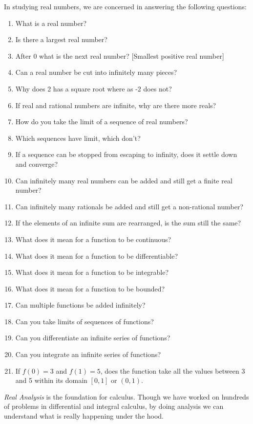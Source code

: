 \documentclass[10pt]{article}
\begin{document}
In studying real numbers, we are concerned in answering the following questions:
\begin{enumerate}
\item What is a real number?
\item Is there a largest real number?
\item After 0 what is the next real number? [Smallest positive real number]
\item Can a real number be cut into infinitely many pieces?
\item Why does 2 has a square root where as -2 does not?
\item If real and rational numbers are infinite, why are there more reals?
\item How do you take the limit of a sequence of real numbers?
\item Which sequences have limit, which don't?
\item If a sequence can be stopped from escaping to infinity, does it settle
  down and converge?
\item Can infinitely many real numbers can be added and still get a finite real
  number?
\item Can infinitely many rationals be added and still get a non-rational
  number?
\item If the elements of an infinite sum are rearranged, is the sum still the
  same?
\item What does it mean for a function to be continuous?
\item What does it mean for a function to be differentiable?
\item What does it mean for a function to be integrable?
\item What does it mean for a function to be bounded?
\item Can multiple functions be added infinitely?
\item Can you take limits of sequences of functions?
\item Can you differentiate an infinite series of functions?
\item Can you integrate an infinite series of functions?
\item If \( f(0) = 3 \) and \( f(1) = 5 \), does the function take all the
  values between 3 and 5 within its domain \( [0, 1] \) or \( (0, 1) \).
\end {enumerate}



{\em Real Analysis} is the foundation for calculus. Though we have worked on
hundreds of problems in differential and integral calculus, by doing analysis we
can understand what is really happening under the hood.
\end{document}
